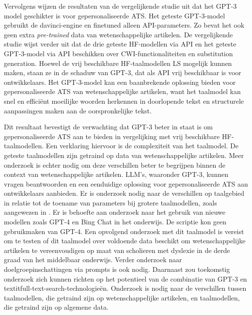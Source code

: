 \medspace

Vervolgens wijzen de resultaten van de vergelijkende studie uit dat het GPT-3 model geschikter is voor gepersonaliseerde ATS. Het geteste GPT-3-model gebruikt de davinci-engine en finetuned alleen API-parameters. Zo bevat het ook geen extra \textit{pre-trained} data van wetenschappelijke artikelen. De vergelijkende studie wijst verder uit dat de drie geteste HF-modellen via API en het geteste GPT-3-model via API beschikken over CWI-functionaliteiten en substitution generation. Hoewel de vrij beschikbare HF-taalmodellen LS mogelijk kunnen maken, staan ze in de schaduw van GPT-3, dat als API vrij beschikbaar is voor ontwikkelaars. Het GPT-3-model kan een baanbrekende oplossing bieden voor gepersonaliseerde ATS van wetenschappelijke artikelen, want het taalmodel kan snel en efficiënt moeilijke woorden herkennen in doorlopende tekst en structurele aanpassingen maken aan de oorspronkelijke tekst.

\medspace

Dit resultaat bevestigt de verwachting dat GPT-3 beter in staat is om gepersonaliseerde ATS aan te bieden in vergelijking met vrij beschikbare HF-taalmodellen. Een verklaring hiervoor is de complexiteit van het taalmodel. De geteste taalmodellen zijn getraind op data van wetenschappelijke artikelen. Meer onderzoek is echter nodig om deze verschillen beter te begrijpen binnen de context van wetenschappelijke artikelen. LLM's, waaronder GPT-3, kunnen vragen beantwoorden en een eenduidige oplossing voor gepersonaliseerde ATS aan ontwikkelaars aanbieden. Er is onderzoek nodig naar de verschillen op taalgebied in relatie tot de toename van parameters bij grotere taalmodellen, zoals aangewezen in \textcite{Simon2021}. Er is behoefte aan onderzoek naar het gebruik van nieuwe modellen zoals GPT-4 en Bing Chat in het onderwijs. De scriptie kon geen gebruikmaken van GPT-4. Een opvolgend onderzoek met dit taalmodel is vereist om te testen of dit taalmodel over voldoende data beschikt om wetenschappelijke artikelen te vereenvoudigen op maat van scholieren met dyslexie in de derde graad van het middelbaar onderwijs. Verder onderzoek naar doelgroepinschattingen via prompts is ook nodig. Daarnaast zou toekomstig onderzoek zich kunnen richten op het potentieel van de combinatie van GPT-3 en textit{full-text-search}-technologieën. Onderzoek is nodig naar de verschillen tussen taalmodellen, die getraind zijn op wetenschappelijke artikelen, en taalmodellen, die getraind zijn op algemene data. 

\medspace

